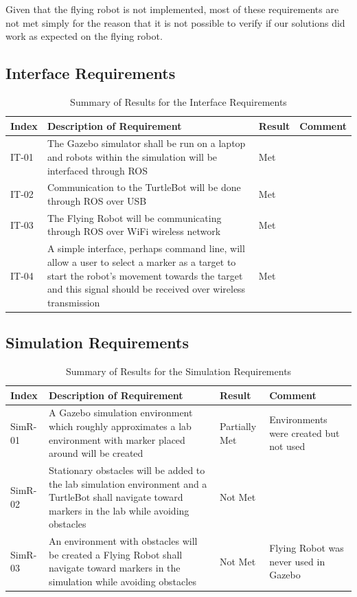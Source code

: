 \documentclass{article}[12]
\begin{document}
Given that the flying robot is not implemented, most of these requirements are not met simply for the reason that it is not possible to verify if our solutions did work as expected on the flying robot.

 \subsection{Interface Requirements}

	\begin{table}[H]
  \small
		\begin{tabular}{p{2cm} p{8cm} p{2cm} p{3cm}}
			\hline
			{\textbf{Index}} & {\textbf{Description of Requirement}} & {\textbf{Result}} & {\textbf{Comment}} \\ \hline
IT-01 & The Gazebo simulator shall be run on a laptop and robots within the simulation will be interfaced through ROS & Met & \\
IT-02 & Communication to the TurtleBot will be done through ROS over USB & Met & \\
IT-03 & The Flying Robot will be communicating through ROS over WiFi wireless network & Met &\\
IT-04 & A simple interface, perhaps command line, will allow a user to select a marker as a target to start the robot's movement towards the target and this signal should be received over wireless transmission & Met & \\ \hline
		\end{tabular}
		\caption{Summary of Results for the Interface Requirements}
		\label{table:interresults}
 \end{table}
 
 \subsection{Simulation Requirements}

	\begin{table}[H]
  \small
		\begin{tabular}{p{2cm} p{8cm} p{2cm} p{3cm}}
			\hline
			{\textbf{Index}} & {\textbf{Description of Requirement}} & {\textbf{Result}} & {\textbf{Comment}} \\ \hline
SimR-01 & A Gazebo simulation environment which roughly approximates a lab environment with marker placed around will be created & Partially Met & Environments were created but not used\\
SimR-02 & Stationary obstacles will be added to the lab simulation environment and a TurtleBot shall navigate toward markers in the lab while avoiding obstacles & Not Met & \\
SimR-03 & An environment with obstacles will be created a Flying Robot shall navigate toward markers in the simulation while avoiding obstacles & Not Met & Flying Robot was never used in Gazebo \\ \hline
		\end{tabular}
		\caption{Summary of Results for the Simulation Requirements}
		\label{table:simresults}
 \end{table}
\end{document}
